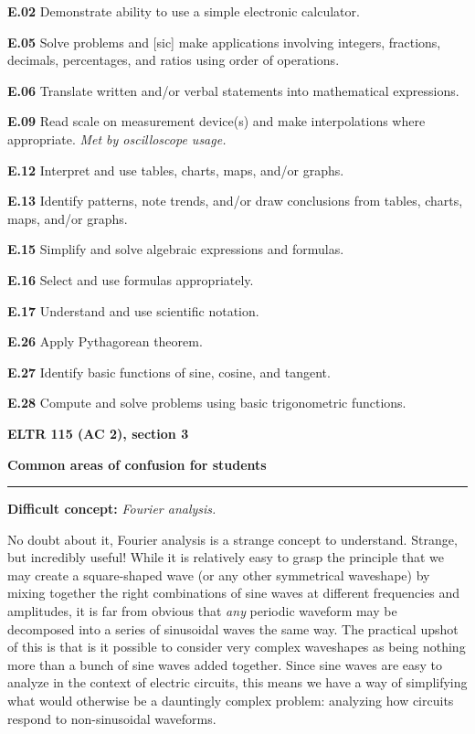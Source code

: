 \item{\bf E.02} Demonstrate ability to use a simple electronic calculator.
\item{\bf E.05} Solve problems and [sic] make applications involving integers, fractions, decimals, percentages, and ratios using order of operations.
\item{\bf E.06} Translate written and/or verbal statements into mathematical expressions.
\item{\bf E.09} Read scale on measurement device(s) and make interpolations where appropriate.  {\it Met by oscilloscope usage.}
\item{\bf E.12} Interpret and use tables, charts, maps, and/or graphs.
\item{\bf E.13} Identify patterns, note trends, and/or draw conclusions from tables, charts, maps, and/or graphs.
\item{\bf E.15} Simplify and solve algebraic expressions and formulas.
\item{\bf E.16} Select and use formulas appropriately.
\item{\bf E.17} Understand and use scientific notation.
\item{\bf E.26} Apply Pythagorean theorem.
\item{\bf E.27} Identify basic functions of sine, cosine, and tangent.
\item{\bf E.28} Compute and solve problems using basic trigonometric functions.
\medskip







\vfil \eject

\centerline{\bf ELTR 115 (AC 2), section 3} \bigskip 
 
\vskip 10pt

\noindent
{\bf Common areas of confusion for students}

\vskip 5pt

\hrule \vskip 5pt

\vskip 10pt

\noindent
{\bf Difficult concept: } {\it Fourier analysis.}

No doubt about it, Fourier analysis is a strange concept to understand.  Strange, but incredibly useful!  While it is relatively easy to grasp the principle that we may create a square-shaped wave (or any other symmetrical waveshape) by mixing together the right combinations of sine waves at different frequencies and amplitudes, it is far from obvious that {\it any} periodic waveform may be decomposed into a series of sinusoidal waves the same way.  The practical upshot of this is that is it possible to consider very complex waveshapes as being nothing more than a bunch of sine waves added together.  Since sine waves are easy to analyze in the context of electric circuits, this means we have a way of simplifying what would otherwise be a dauntingly complex problem: analyzing how circuits respond to non-sinusoidal waveforms.

